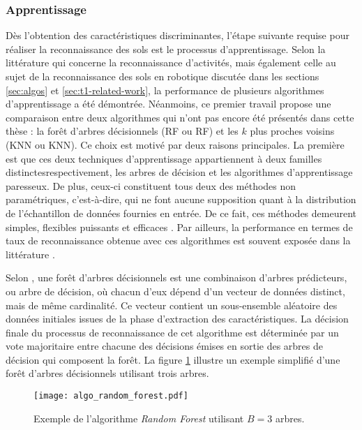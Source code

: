 \subsubsection{Apprentissage}

Dès l'obtention des caractéristiques discriminantes, l'étape suivante requise pour réaliser la reconnaissance des sols est le processus d'apprentissage. Selon la littérature qui concerne la reconnaissance d'activités, mais également celle au sujet de la reconnaissance des sols en robotique discutée dans les sections \ref{sec:algos} et \ref{sec:t1-related-work}, la performance de plusieurs algorithmes d'apprentissage a été démontrée. Néanmoins, ce premier travail propose une comparaison entre deux algorithmes qui n'ont pas encore été présentés dans cette thèse : la forêt d'arbres décisionnels (\acl{RF} ou \acs{RF}) et les $k$ plus proches voisins (\acl{KNN} ou \acs{KNN}). Ce choix est motivé par deux raisons principales. La première est que ces deux techniques d'apprentissage appartiennent à deux familles distinctes\textemdash respectivement, les arbres de décision et les algorithmes d'apprentissage \og{}paresseux\fg{}. De plus, ceux-ci constituent tous deux des méthodes non paramétriques, c'est-à-dire, qui ne font aucune supposition quant à la distribution de l'échantillon de données fournies en entrée. De ce fait, ces méthodes demeurent simples, flexibles puissants et efficaces \citep{Russell2010}. Par ailleurs, la performance en termes de taux de reconnaissance obtenue avec ces algorithmes est souvent exposée dans la littérature \citep{Kertesz2016, Vail2004}.

Selon \cite{Breiman2001}, une forêt d'arbres décisionnels est une combinaison d'arbres prédicteurs, ou arbre de décision, où chacun d'eux dépend d'un vecteur de données distinct, mais de même cardinalité. Ce vecteur contient un sous-ensemble aléatoire des données initiales issues de la phase d'extraction des caractéristiques. La décision finale du processus de reconnaissance de cet algorithme est déterminée par un vote majoritaire entre chacune des décisions émises en sortie des arbres de décision qui composent la forêt. La figure \ref{fig:algo_random_forest} illustre un exemple simplifié d'une forêt d'arbres décisionnels utilisant trois arbres.

\begin{figure}[H]
	\centering
	\texttt{[image: algo\_random\_forest.pdf]}
        \caption{Exemple de l'algorithme \textit{Random Forest} utilisant $B=3$ arbres.}
	\label{fig:algo_random_forest}
\end{figure}

